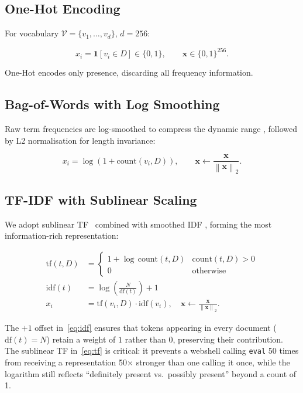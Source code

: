 \documentclass[10pt,conference,letterpaper]{IEEEtran}
\newcommand{\norm}[1]{\left\lVert#1\right\rVert}
\begin{document}
\subsection{One-Hot Encoding}

For vocabulary $\mathcal{V}=\{v_1,\ldots,v_d\}$, $d=256$:
\begin{tcolorbox}[eqbox]
\[
  x_i = \mathbf{1}\!\left[v_i \in D\right] \in \{0,1\},
  \qquad \bm{x}\in\{0,1\}^{256}.
\]
\end{tcolorbox}
One-Hot encodes only presence, discarding all frequency information.

\subsection{Bag-of-Words with Log Smoothing}

Raw term frequencies are log-smoothed to compress the dynamic range
\cite{robertson2004idf}, followed by L2 normalisation for length invariance:
\begin{tcolorbox}[eqbox]
\[
  x_i = \log(1+\text{count}(v_i,D)),
  \qquad \bm{x} \leftarrow \frac{\bm{x}}{\norm{\bm{x}}_2}.
\]
\end{tcolorbox}

\subsection{TF-IDF with Sublinear Scaling}

We adopt sublinear TF~\cite{jones1972idf} combined with smoothed IDF
\cite{salton1988idf}, forming the most information-rich representation:
\begin{tcolorbox}[eqbox]
\begin{align}
  \mathrm{tf}(t,D) &= \begin{cases}
    1+\log\,\mathrm{count}(t,D) & \mathrm{count}(t,D)>0 \\
    0 & \text{otherwise}
  \end{cases} \label{eq:tf} \\[4pt]
  \mathrm{idf}(t)  &= \log\!\left(\frac{N}{\mathrm{df}(t)}\right)+1
  \label{eq:idf} \\[4pt]
  x_i              &= \mathrm{tf}(v_i,D)\cdot\mathrm{idf}(v_i),
  \quad \bm{x}\leftarrow\tfrac{\bm{x}}{\norm{\bm{x}}_2}.
  \label{eq:tfidf}
\end{align}
\end{tcolorbox}

The $+1$ offset in~\eqref{eq:idf} ensures that tokens appearing in every document
($\mathrm{df}(t)=N$) retain a weight of $1$ rather than $0$, preserving their
contribution. The sublinear TF in~\eqref{eq:tf} is critical: it prevents a webshell
calling \texttt{eval} 50 times from receiving a representation 50$\times$ stronger
than one calling it once, while the logarithm still reflects ``definitely present
vs.\ possibly present'' beyond a count of 1.
\end{document}
